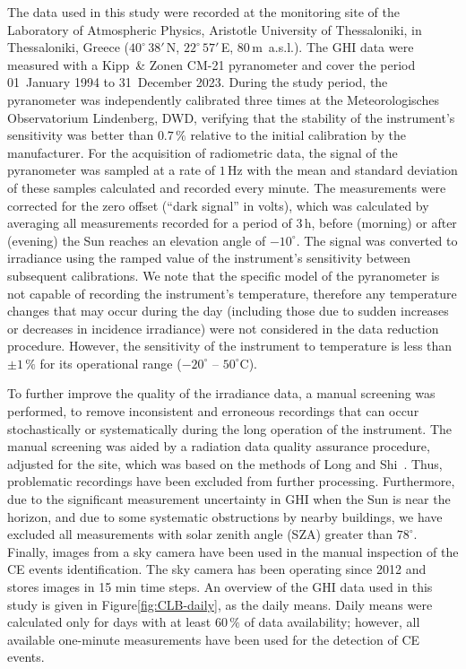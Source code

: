 \documentclass[preprint, 5p,
authoryear]{elsarticle} %
\begin{document}
The data used in this study were recorded at the monitoring site of the
Laboratory of Atmospheric Physics, Aristotle University of Thessaloniki,
in Thessaloniki, Greece (\(40^\circ\,38'\,\)N, \(22^\circ\,57'\,\)E,
\(80\,\)m~a.s.l.). The GHI data were measured with a Kipp~\& Zonen CM-21
pyranometer and cover the period 01~January 1994 to 31~December 2023.
During the study period, the pyranometer was independently calibrated
three times at the Meteorologisches Observatorium Lindenberg, DWD,
verifying that the stability of the instrument's sensitivity was better
than \(0.7\,\%\) relative to the initial calibration by the
manufacturer. For the acquisition of radiometric data, the signal of the
pyranometer was sampled at a rate of \(1\,\text{Hz}\) with the mean and
standard deviation of these samples calculated and recorded every
minute. The measurements were corrected for the zero offset (``dark
signal'' in volts), which was calculated by averaging all measurements
recorded for a period of \(3\,\text{h}\), before (morning) or after
(evening) the Sun reaches an elevation angle of \(-10^\circ\). The
signal was converted to irradiance using the ramped value of the
instrument's sensitivity between subsequent calibrations. We note that
the specific model of the pyranometer is not capable of recording the
instrument's temperature, therefore any temperature changes that may
occur during the day (including those due to sudden increases or
decreases in incidence irradiance) were not considered in the data
reduction procedure. However, the sensitivity of the instrument to
temperature is less than \(\pm1\,\%\) for its operational range
(\(-20^\circ\) -- \(50^\circ\)C).

To further improve the quality of the irradiance data, a manual
screening was performed, to remove inconsistent and erroneous recordings
that can occur stochastically or systematically during the long
operation of the instrument. The manual screening was aided by a
radiation data quality assurance procedure, adjusted for the site, which
was based on the methods of Long and Shi~\citep{Long2006, Long2008a}.
Thus, problematic recordings have been excluded from further processing.
Furthermore, due to the significant measurement uncertainty in GHI when
the Sun is near the horizon, and due to some systematic obstructions by
nearby buildings, we have excluded all measurements with solar zenith
angle (SZA) greater than \(78^\circ\). Finally, images from a sky camera
have been used in the manual inspection of the CE events identification.
The sky camera has been operating since 2012 and stores images in 15 min
time steps. An overview of the GHI data used in this study is given in
Figure\nobreakspace{}\ref{fig:CLB-daily}, as the daily means. Daily
means were calculated only for days with at least \(60\,\%\) of data
availability; however, all available one-minute measurements have been
used for the detection of CE events.
\end{document}
